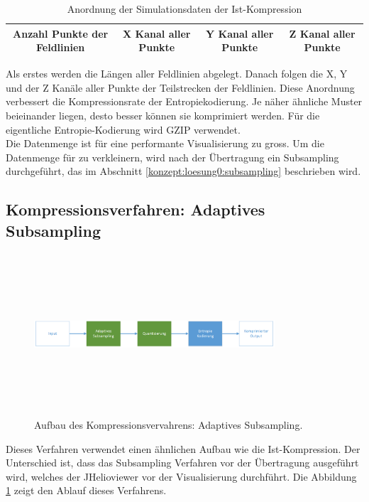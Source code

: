 \begin{table}[!htbp]
	\center
	\begin{tabular}{|c|c|c|c|}
	\hline
	Anzahl Punkte der Feldlinien & X Kanal aller Punkte & Y Kanal aller Punkte & Z Kanal aller Punkte \\\hline
	\end{tabular}
	\caption{Anordnung der Simulationsdaten der Ist-Kompression}
	\label{konzept:ist:entropie}
\end{table}
Als erstes werden die Längen aller Feldlinien abgelegt. Danach folgen die X, Y und der Z Kanäle aller Punkte der Teilstrecken der Feldlinien. Diese Anordnung verbessert die Kompressionsrate der Entropiekodierung. Je näher ähnliche Muster beieinander liegen, desto besser können sie komprimiert werden. Für die eigentliche Entropie-Kodierung wird GZIP verwendet.\\
Die Datenmenge ist für eine performante Visualisierung zu gross. Um die Datenmenge für zu verkleinern, wird nach der Übertragung ein Subsampling durchgeführt, das im Abschnitt \ref{konzept:loesung0:subsampling} beschrieben wird.

\subsection{Kompressionsverfahren: Adaptives Subsampling} \label{konzept:loesung0}
\begin{figure}[!htbp]
	\center
	\includegraphics[width=0.8\textwidth,height=6cm,keepaspectratio]{./pictures/konzept/solution0/aufbau.png}
	\caption{Aufbau des Kompressionsvervahrens: Adaptives Subsampling.}
	\label{konzept:loesung0:aufbau:diagramm}
\end{figure} 
Dieses Verfahren verwendet einen ähnlichen Aufbau wie die Ist-Kompression. Der Unterschied ist, dass das Subsampling Verfahren vor der Übertragung ausgeführt wird, welches der JHelioviewer vor der Visualisierung durchführt. Die Abbildung \ref{konzept:loesung0:aufbau:diagramm} zeigt den Ablauf dieses Verfahrens.\\

